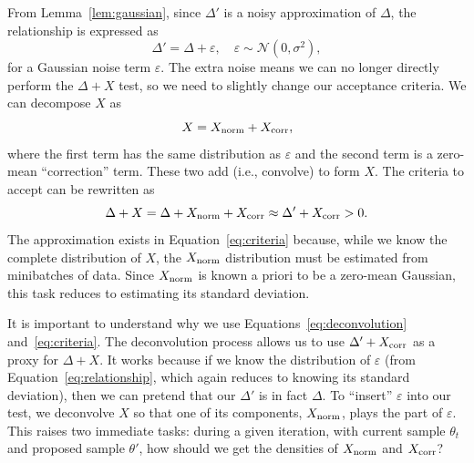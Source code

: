 \documentclass{article}
\begin{document}
From Lemma~\ref{lem:gaussian}, since $\Delta'$ is a noisy approximation of $\Delta$, the
relationship is expressed as
\begin{equation}\label{eq:relationship}
\Delta' = \Delta + \varepsilon, \quad \varepsilon \sim \mathcal{N}(0, \sigma^2),
\end{equation}
for a Gaussian noise term $\varepsilon$.  The extra noise means we can no longer directly perform
the $\Delta + X$ test, so we need to slightly change our acceptance criteria. We can decompose $X$
as
\begin{equation}\label{eq:deconvolution}
X = X_{\rm norm}+X_{\rm corr},
\end{equation}
where the first term has the same distribution as $\varepsilon$ and the second term is a zero-mean
``correction'' term.  These two add (i.e., convolve) to form $X$. The criteria to accept can be rewritten as
\begin{equation}\label{eq:criteria}
\Delta + X = \Delta + X_{\rm norm} + X_{\rm corr} \approx \Delta' + X_{\rm corr} >0.
\end{equation}
The approximation exists in Equation~\ref{eq:criteria} because, while we know the complete
distribution of $X$, the $X_{\rm norm}$ distribution must be estimated from minibatches of data.
Since $X_{\rm norm}$ is known a priori to be a zero-mean Gaussian, this task reduces to estimating
its standard deviation.

It is important to understand why we use Equations~\ref{eq:deconvolution} and~\ref{eq:criteria}. The
deconvolution process allows us to use $\Delta' + X_{\rm corr}$ as a proxy for $\Delta + X$. It
works because if we know the distribution of $\varepsilon$ (from Equation~\ref{eq:relationship},
which again reduces to knowing its standard deviation), then we can pretend that our $\Delta'$ is in
fact $\Delta$. To ``insert'' $\varepsilon$ into our test, we deconvolve $X$ so that one of its
components, $X_{\rm norm}$, plays the part of $\varepsilon$. This raises two immediate tasks: during
a given iteration, with current sample $\theta_t$ and proposed sample $\theta'$, how should we get
the densities of $X_{\rm norm}$ and $X_{\rm corr}$?
\end{document}
